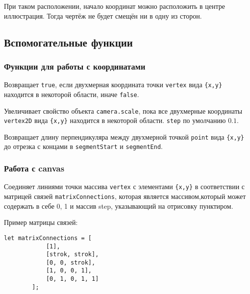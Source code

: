 При таком расположении, начало координат можно расположить в центре иллюстрация. Тогда чертёж не будет смещён ни в одну из сторон.

\subsection{Вспомогательные функции}

\subsubsection{Функции для работы с координатами}


Возвращает \texttt{true}, если двухмерная координата точки \texttt{vertex} вида \texttt{\{x,y\}} находится в некоторой области, иначе \texttt{false}.


Увеличивает свойство объекта \texttt{camera.scale}, пока все двухмерные координаты \texttt{vertex2D} вида \texttt{\{x,y\}}  находится в некоторой области. \texttt{step} по умолчанию $0.1$.


Возвращает длину перпендикуляра между двухмерной точкой \texttt{point} вида \texttt{\{x,y\}} до отрезка с концами в \texttt{segmentStart} и \texttt{segmentEnd}.

\subsubsection{Работа с canvas}


Соединяет линиями точки массива \texttt{vertex} с элементами \texttt{\{x,y\}} в соответствии с матрицей связей \texttt{matrixConnections}, которая является массивом,который может содержать в себе 0, 1 и массив step, указывающий на отрисовку пунктиром.

Пример матрицы связей:
\begin{lstlisting}[frame=none]
	let matrixConnections = [
			[1],
			[strok, strok],
			[0, 0, strok],
			[1, 0, 0, 1],
			[0, 1, 0, 1, 1]
		];
	\end{lstlisting}

